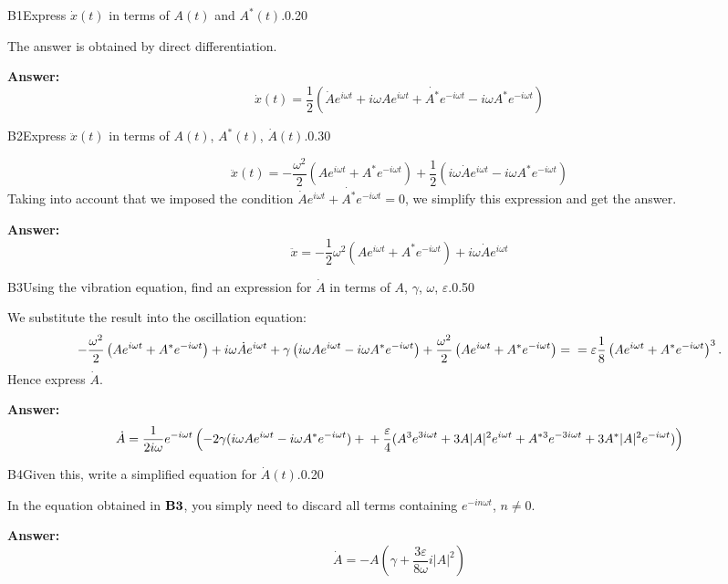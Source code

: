 \documentclass[11pt,a4paper]{article}
\begin{document}
\begin{solcard}{B1}{Express $\dot{x}(t)$ in terms of $A(t)$ and $A^*(t)$.}{0.20}

The answer is obtained by direct differentiation.

\par\smallskip\noindent\textbf{Answer:} \[\dot{x}(t) = \frac{1}{2}(\dot{A}e^{i\omega t}+i\omega A e^{i\omega t} + \dot{A^*}e^{-i\omega t}-i\omega A^* e^{-i\omega t})\]
\end{solcard}

\begin{solcard}{B2}{Express $\ddot{x}(t)$ in terms of $A(t)$, $A^*(t)$, $\dot{A}(t)$.}{0.30}

$$ \ddot{x}(t) = -\frac{\omega^2}{2}\left(A e^{i\omega t} + A^*e^{-i\omega t}\right) + \frac{1}{2}\left( i \omega \dot{A} e^{i\omega t} - i \omega A^* e^{-i\omega t} \right) $$Taking into account that we imposed the condition $\dot{A} e^{i \omega t} + \dot{A^*} e^{-i \omega t} = 0$, we simplify this expression and get the answer.

\par\smallskip\noindent\textbf{Answer:} \[\ddot{x}=-\frac{1}{2}\omega^2(A e^{i \omega t} + A^*e^{-i\omega t}) + i \omega \dot{A} e^{i \omega t}\]
\end{solcard}

\begin{solcard}{B3}{Using the vibration equation, find an expression for $\dot{A}$ in terms of $A$, $\gamma$, $\omega$, $\varepsilon$.}{0.50}

We substitute the result into the oscillation equation: $$ -\frac{\omega^2}{2}\left(A e^{i\omega t} + A^*e^{-i\omega t}\right) + i \omega \dot{A} e^{i\omega t} + \gamma \left(i \omega A e^{i \omega t} -i\omega A^*e^{-i\omega t}\right) + \frac{\omega^2}{2}\left(A e^{i\omega t} + A^*e^{-i\omega t}\right) =\\= \varepsilon \frac{1}{8} \left(A e^{i \omega t} + A^*e^{-i\omega t}\right)^3 . $$    Hence express $\dot{A}$.

\par\smallskip\noindent\textbf{Answer:} \[\dot{A} = \frac{1}{2i\omega}e^{-i \omega t}\left(-2\gamma(i \omega A e^{i\omega t} - i \omega A^* e^{-i\omega t}) +\\+ \frac{\varepsilon}{4}(A^3 e^{3i\omega t} + 3A |A|^2 e^{i\omega t} + A^{*3} e^{-3i\omega t} + 3A^* |A|^2 e^{-i\omega t})\right)\]
\end{solcard}

\begin{solcard}{B4}{Given this, write a simplified equation for $\dot{A}(t)$.}{0.20}

In the equation obtained in $\bf B3$, you simply need to discard all terms containing $e^{-in\omega t}$, $n\neq0$.

\par\smallskip\noindent\textbf{Answer:} \[\dot{A}=-A\left(\gamma +\frac{3\varepsilon}{8\omega}i|A|^2\right)\]
\end{solcard}
\end{document}
